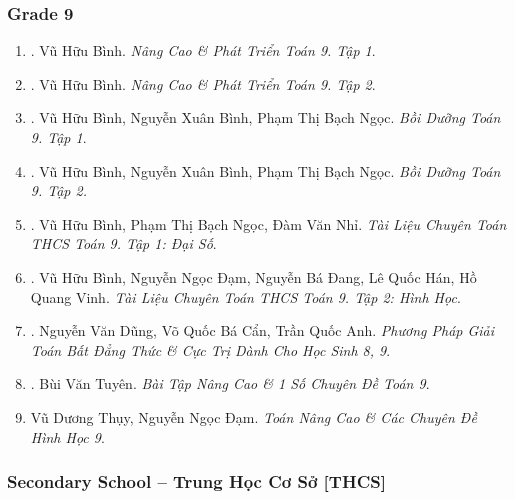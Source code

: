 \documentclass{article}
\begin{document}
\subsubsection{Grade 9}

\begin{enumerate}
	\item \cite{Binh_Toan_9_tap_1}. Vũ Hữu Bình. \textit{Nâng Cao \& Phát Triển Toán 9. Tập 1}.\hfill{\sf[done]}
	\item \cite{Binh_Toan_9_tap_2}. Vũ Hữu Bình. \textit{Nâng Cao \& Phát Triển Toán 9. Tập 2}.\hfill{\sf[done]}
	\item \cite{Binh_boi_duong_Toan_9_tap_1}. Vũ Hữu Bình, Nguyễn Xuân Bình, Phạm Thị Bạch Ngọc. \textit{Bồi Dưỡng Toán 9. Tập 1}.\hfill{\sf[done]}
	\item \cite{Binh_boi_duong_Toan_9_tap_2}. Vũ Hữu Bình, Nguyễn Xuân Bình, Phạm Thị Bạch Ngọc. \textit{Bồi Dưỡng Toán 9. Tập 2.}\hfill{\sf[done]}
	\item \cite{TLCT_THCS_Toan_9_dai_so}. Vũ Hữu Bình, Phạm Thị Bạch Ngọc, Đàm Văn Nhỉ. \textit{Tài Liệu Chuyên Toán THCS Toán 9. Tập 1: Đại Số}.\hfill{\sf[done]}
	\item \cite{TLCT_THCS_Toan_9_hinh_hoc}. Vũ Hữu Bình, Nguyễn Ngọc Đạm, Nguyễn Bá Đang, Lê Quốc Hán, Hồ Quang Vinh. \textit{Tài Liệu Chuyên Toán THCS Toán 9. Tập 2: Hình Học}.\hfill{\sf[done]}
	\item \cite{Dung_Can_Anh_BDT_8_9}. Nguyễn Văn Dũng, Võ Quốc Bá Cẩn, Trần Quốc Anh. \textit{Phương Pháp Giải Toán Bất Đẳng Thức \& Cực Trị Dành Cho Học Sinh 8, 9}.\hfill{\sf[reading]}
	\item \cite{Tuyen_Toan_9_old}. Bùi Văn Tuyên. \textit{Bài Tập Nâng Cao \& 1 Số Chuyên Đề Toán 9}.\hfill{\sf[done]}
	\item Vũ Dương Thụy, Nguyễn Ngọc Đạm. \textit{Toán Nâng Cao \& Các Chuyên Đề Hình Học 9}.
\end{enumerate}

\subsubsection{Secondary School -- Trung Học Cơ Sở [THCS]}
\end{document}
